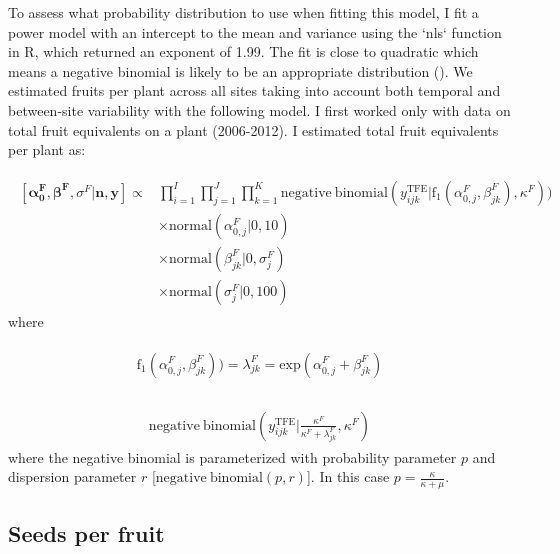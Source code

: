 \documentclass[12pt, oneside, titlepage]{article}   	%
\begin{document}
To assess what probability distribution to use when fitting this model, I fit a power model with an intercept to the mean and variance using the `nls` function in R, which returned an exponent of 1.99. The fit is close to quadratic which means a negative binomial is likely to be an appropriate distribution (\cite{linden2011}). We estimated fruits per plant across all sites taking into account both temporal and between-site variability with the following model. I first worked only with data on total fruit equivalents on a plant (2006-2012). I estimated total fruit equivalents per plant as: 

\begin{align}
  \begin{split}
 [ \bm{\alpha^F_0}, \bm{\beta^F}, \sigma^F | \bm{n}, \bm{y} ] \propto 
 & \prod_{i=1}^{I} \prod_{j=1}^{J} \prod_{k=1}^{K}  \mathrm{negative \ binomial} ( y^{\mathrm{TFE}}_{ijk} | \mathrm{f}_1(\alpha^F_{0,j} , \beta^F_{jk} ),  \kappa^F ) )
     \\ & \times \mathrm{normal} ( \alpha^F_{0,j} | 0, 10) 
     \\ & \times \mathrm{normal} ( \beta^F_{jk} | 0, \sigma^F_j) 
    \\ & \times \mathrm{normal} ( \sigma^F_j | 0, 100)  
   \end{split}
\end{align}
%
where

\begin{align}
  \begin{split}
\mathrm{f}_1(\alpha^F_{0,j} , \beta^F_{jk} ) ) = \lambda^F_{jk} = \mathrm{exp}( \alpha^F_{0,j} + \beta^F_{jk} ) \\
  \end{split}
\end{align}

\begin{align}
  \begin{split}
  \mathrm{negative \ binomial} ( y^{\mathrm{TFE}}_{ijk} | \frac{\kappa^F}{\kappa^F + \lambda^F_{jk}} ,  \kappa^F )
  \end{split}
\end{align}
%
where the negative binomial is parameterized with probability parameter $p$ and dispersion parameter $r$ [$ \mathrm{negative \ binomial}(p,r)$]. In this case $p=\frac{\kappa}{\kappa+\mu}$.

\subsection*{Seeds per fruit}
\end{document}
